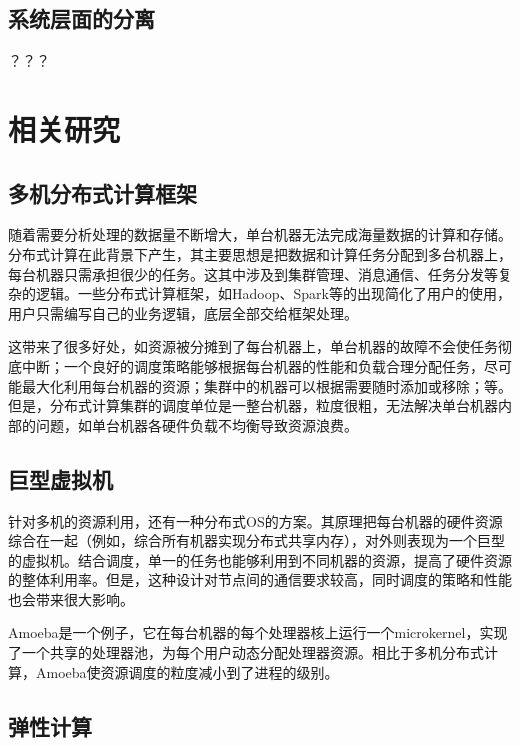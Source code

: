 \subsection{系统层面的分离}

？？？


\section{相关研究}

\subsection{多机分布式计算框架}

随着需要分析处理的数据量不断增大，单台机器无法完成海量数据的计算和存储。分布式计算在此背景下产生，其主要思想是把数据和计算任务分配到多台机器上，每台机器只需承担很少的任务。这其中涉及到集群管理、消息通信、任务分发等复杂的逻辑。一些分布式计算框架，如Hadoop、Spark等的出现简化了用户的使用，用户只需编写自己的业务逻辑，底层全部交给框架处理。

这带来了很多好处，如资源被分摊到了每台机器上，单台机器的故障不会使任务彻底中断；一个良好的调度策略能够根据每台机器的性能和负载合理分配任务，尽可能最大化利用每台机器的资源；集群中的机器可以根据需要随时添加或移除；等。但是，分布式计算集群的调度单位是一整台机器，粒度很粗，无法解决单台机器内部的问题，如单台机器各硬件负载不均衡导致资源浪费。

\subsection{巨型虚拟机}

针对多机的资源利用，还有一种分布式OS的方案。其原理把每台机器的硬件资源综合在一起（例如，综合所有机器实现分布式共享内存），对外则表现为一个巨型的虚拟机。结合调度，单一的任务也能够利用到不同机器的资源，提高了硬件资源的整体利用率。但是，这种设计对节点间的通信要求较高，同时调度的策略和性能也会带来很大影响。

Amoeba\parencite{tanenbaum1991amoeba}是一个例子，它在每台机器的每个处理器核上运行一个microkernel，实现了一个共享的处理器池，为每个用户动态分配处理器资源。相比于多机分布式计算，Amoeba使资源调度的粒度减小到了进程的级别。

\subsection{弹性计算}

